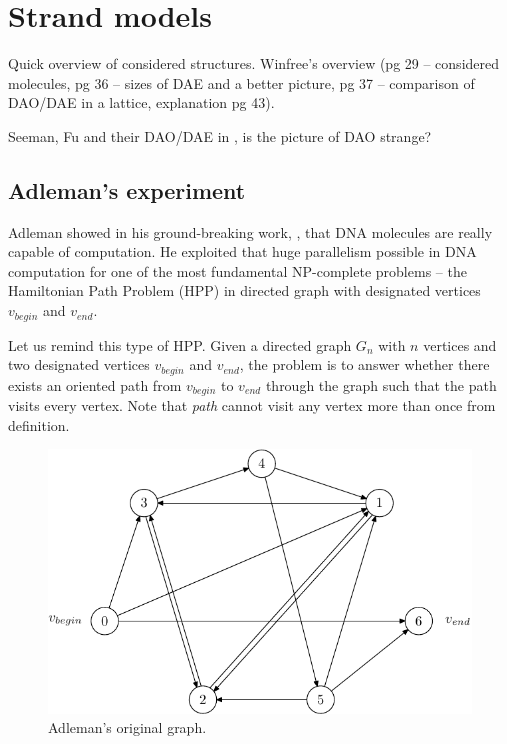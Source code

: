 \chapter{Strand models}


Quick overview of considered structures. Winfree's overview (pg 29 -- considered molecules, pg 36 -- sizes of DAE and a better picture, pg 37 -- comparison of DAO/DAE in a lattice, explanation pg 43).

Seeman, Fu and their DAO/DAE in \cite{seeman93}, is the picture of DAO strange?

\section{Adleman's experiment}
	
	Adleman showed in his ground-breaking work, \cite{adleman94}, that DNA molecules are really capable of computation. He exploited that huge parallelism possible in DNA computation for one of the most fundamental NP-complete problems -- the Hamiltonian Path Problem (HPP) in directed graph with designated vertices $v_{begin}$ and $v_{end}$.
	
	Let us remind this type of HPP. Given a directed graph $G_n$ with $n$ vertices and two designated vertices $v_{begin}$ and $v_{end}$, the problem is to answer whether there exists an oriented path from $v_{begin}$ to $v_{end}$ through the graph such that the path visits every vertex. Note that {\em path} cannot visit any vertex more than once from definition.
	
	\begin{figure}[H]
	\begin{center}
		\includegraphics{./figures/adleman_graph.pdf}
		\caption{Adleman's original graph.}
		\label{fig:adleman_graph}
	\end{center}
	\end{figure}
	
